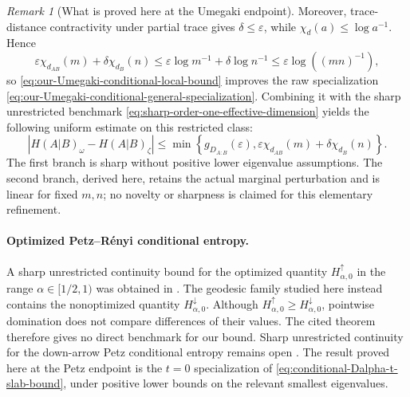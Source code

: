 \documentclass[11pt]{article}
\theoremstyle{remark}
\newtheorem{remark}[remark]{Remark}
\newcommand{\1}{\mathbbm{1}}
\begin{document}
\begin{remark}[What is proved here at the Umegaki endpoint]
Moreover, trace-distance contractivity under partial trace
\cite[Eq.~(1.183)]{watrous2018theory} gives
$\delta\leq\varepsilon$, while
$\chi_d(a)\leq\log a^{-1}$.  Hence
\begin{equation}
 \varepsilon\chi_{d_{AB}}(m)+\delta\chi_{d_B}(n)
 \leq\varepsilon\log m^{-1}+\delta\log n^{-1}
 \leq\varepsilon\log((mn)^{-1}),
 \label{eq:Umegaki-local-improves-general-specialization}
\end{equation}
so \eqref{eq:our-Umegaki-conditional-local-bound} improves the raw
specialization \eqref{eq:our-Umegaki-conditional-general-specialization}.
Combining it with the sharp unrestricted benchmark
\eqref{eq:sharp-order-one-effective-dimension} yields the following
uniform estimate on this restricted class:
\begin{equation}
 \left|H(A|B)_\omega-H(A|B)_\zeta\right|
 \leq\min\left\{
 g_{D_{A:B}}(\varepsilon),
 \varepsilon\chi_{d_{AB}}(m)+\delta\chi_{d_B}(n)
 \right\}.
 \label{eq:combined-Umegaki-conditional-bound}
\end{equation}
The first branch is sharp without positive lower eigenvalue
assumptions.  The second branch, derived here, retains the actual
marginal perturbation and is linear for fixed $m,n$; no novelty or
sharpness is claimed for this elementary refinement.
\end{remark}

\paragraph{Optimized Petz--R\'enyi conditional entropy.}
A sharp unrestricted continuity bound for the optimized quantity
$H_{\alpha,0}^\uparrow$ in the range $\alpha\in[1/2,1)$ was obtained
in \cite[Theorem~2.1]{cheng2026sharprenyi}.  The geodesic family
studied here instead contains the nonoptimized quantity
$H_{\alpha,0}^\downarrow$.  Although
$H_{\alpha,0}^\uparrow\geq H_{\alpha,0}^\downarrow$, pointwise
domination does not compare differences of their values.  The cited
theorem therefore gives no direct benchmark for our bound.  Sharp unrestricted continuity for the down-arrow
Petz conditional entropy remains open
\cite[Section~7.5]{cheng2026sharprenyi}.  The result proved here at
the Petz endpoint is the $t=0$ specialization of
\eqref{eq:conditional-Dalpha-t-slab-bound}, under positive lower
bounds on the relevant smallest eigenvalues.
\end{document}

